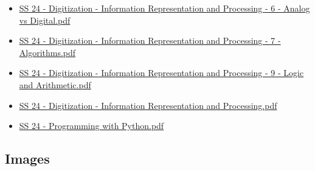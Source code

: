 \documentclass[
  letterpaper,
  DIV=11]{scrartcl}
\begin{document}
\begin{itemize}
{  24 - Digitization - Information Representation and Processing - 5 -
  Codes.pdf}
\item
  \href{google_slides/wirtschaftsinformatik/SS\%2024\%20-\%20Digitization\%20-\%20Information\%20Representation\%20and\%20Processing\%20-\%206\%20-\%20Analog\%20vs\%20Digital.pdf}{SS
  24 - Digitization - Information Representation and Processing - 6 -
  Analog vs Digital.pdf}
\item
  \href{google_slides/wirtschaftsinformatik/SS\%2024\%20-\%20Digitization\%20-\%20Information\%20Representation\%20and\%20Processing\%20-\%207\%20-\%20Algorithms.pdf}{SS
  24 - Digitization - Information Representation and Processing - 7 -
  Algorithms.pdf}
\item
  \href{google_slides/wirtschaftsinformatik/SS\%2024\%20-\%20Digitization\%20-\%20Information\%20Representation\%20and\%20Processing\%20-\%209\%20-\%20Logic\%20and\%20Arithmetic.pdf}{SS
  24 - Digitization - Information Representation and Processing - 9 -
  Logic and Arithmetic.pdf}
\item
  \href{google_slides/wirtschaftsinformatik/SS\%2024\%20-\%20Digitization\%20-\%20Information\%20Representation\%20and\%20Processing.pdf}{SS
  24 - Digitization - Information Representation and Processing.pdf}
\item
  \href{google_slides/wirtschaftsinformatik/SS\%2024\%20-\%20Programming\%20with\%20Python.pdf}{SS
  24 - Programming with Python.pdf}
\end{itemize}

\subsection{Images}\label{images}
\end{document}

